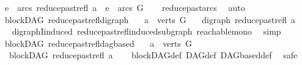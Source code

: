 \begin{isabellebody}
\ \ {\isachardoublequoteopen}e\ {\isasymin}\ arcs\ {\isacharparenleft}{\kern0pt}reduce{\isacharunderscore}{\kern0pt}past{\isacharunderscore}{\kern0pt}refl\ a{\isacharparenright}{\kern0pt}\ {\isasymLongrightarrow}\ e\ {\isasymin}\ arcs\ G{\isachardoublequoteclose}\isanewline
%
\isadelimproof
\ \ %
\endisadelimproof
%
\isatagproof
{}\isamarkupfalse%
\ reduce{\isacharunderscore}{\kern0pt}past{\isacharunderscore}{\kern0pt}arcs\ \isamarkupfalse%
\ auto%
\endisatagproof
{\isafoldproof}%
%
\isadelimproof
\isanewline
%
\endisadelimproof
\isanewline
{}\isamarkupfalse%
\ {\isacharparenleft}{\kern0pt}\ blockDAG{\isacharparenright}{\kern0pt}\ reduce{\isacharunderscore}{\kern0pt}past{\isacharunderscore}{\kern0pt}refl{\isacharunderscore}{\kern0pt}digraph{\isacharcolon}{\kern0pt}\isanewline
\ \ \ {\isachardoublequoteopen}a\ {\isasymin}\ verts\ G{\isachardoublequoteclose}\isanewline
\ \ \ {\isachardoublequoteopen}digraph\ {\isacharparenleft}{\kern0pt}reduce{\isacharunderscore}{\kern0pt}past{\isacharunderscore}{\kern0pt}refl\ a{\isacharparenright}{\kern0pt}{\isachardoublequoteclose}\isanewline
%
\isadelimproof
\ \ %
\endisadelimproof
%
\isatagproof
{}\isamarkupfalse%
\ digraphI{\isacharunderscore}{\kern0pt}induced\ reduce{\isacharunderscore}{\kern0pt}past{\isacharunderscore}{\kern0pt}refl{\isacharunderscore}{\kern0pt}induced{\isacharunderscore}{\kern0pt}subgraph\ reachable{\isacharunderscore}{\kern0pt}mono\ \isamarkupfalse%
\ simp%
\endisatagproof
{\isafoldproof}%
%
\isadelimproof
\isanewline
%
\endisadelimproof
\isanewline
{}\isamarkupfalse%
\ {\isacharparenleft}{\kern0pt}\ blockDAG{\isacharparenright}{\kern0pt}\ reduce{\isacharunderscore}{\kern0pt}past{\isacharunderscore}{\kern0pt}refl{\isacharunderscore}{\kern0pt}dagbased{\isacharcolon}{\kern0pt}\isanewline
\ \ \ {\isachardoublequoteopen}a\ {\isasymin}\ verts\ G{\isachardoublequoteclose}\isanewline
\ \ \ {\isachardoublequoteopen}blockDAG\ {\isacharparenleft}{\kern0pt}reduce{\isacharunderscore}{\kern0pt}past{\isacharunderscore}{\kern0pt}refl\ a{\isacharparenright}{\kern0pt}{\isachardoublequoteclose}\isanewline
%
\isadelimproof
\ \ %
\endisadelimproof
%
\isatagproof
{}\isamarkupfalse%
\ blockDAG{\isacharunderscore}{\kern0pt}def\ DAG{\isacharunderscore}{\kern0pt}def\ DAGbased{\isacharunderscore}{\kern0pt}def\ \isanewline
{}\isamarkupfalse%
\ safe\isanewline
\ \ \isamarkupfalse%

\end{isabellebody}
